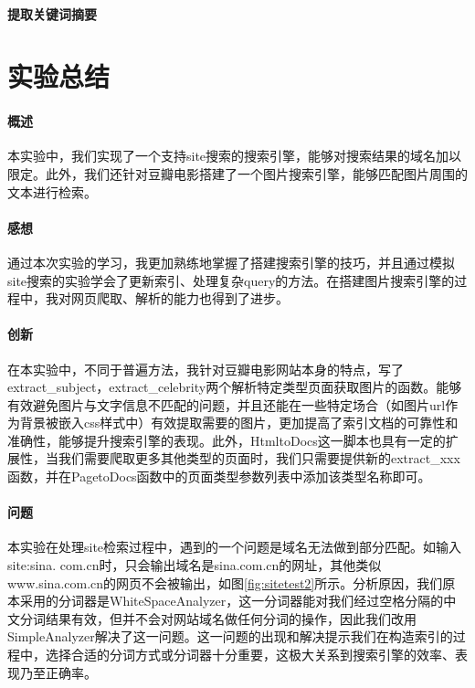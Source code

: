 \documentclass{article}
\begin{document}
\paragraph{提取关键词摘要}



\section{实验总结}
\paragraph{概述}
本实验中，我们实现了一个支持site搜索的搜索引擎，能够对搜索结果的域名加以限定。此外，我们还针对豆瓣电影搭建了一个图片搜索引擎，能够匹配图片周围的文本进行检索。

\paragraph{感想}
通过本次实验的学习，我更加熟练地掌握了搭建搜索引擎的技巧，并且通过模拟site搜索的实验学会了更新索引、处理复杂query的方法。在搭建图片搜索引擎的过程中，我对网页爬取、解析的能力也得到了进步。

\paragraph{创新}
在本实验中，不同于普遍方法，我针对豆瓣电影网站本身的特点，写了extract\_subject，extract\_celebrity两个解析特定类型页面获取图片的函数。能够有效避免图片与文字信息不匹配的问题，并且还能在一些特定场合（如图片url作为背景被嵌入css样式中）有效提取需要的图片，更加提高了索引文档的可靠性和准确性，能够提升搜索引擎的表现。此外，HtmltoDocs这一脚本也具有一定的扩展性，当我们需要爬取更多其他类型的页面时，我们只需要提供新的extract\_xxx函数，并在PagetoDocs函数中的页面类型参数列表中添加该类型名称即可。

\paragraph{问题}
本实验在处理site检索过程中，遇到的一个问题是域名无法做到部分匹配。如输入site:sina. com.cn时，只会输出域名是sina.com.cn的网址，其他类似www.sina.com.cn的网页不会被输出，如图\ref{fig:sitetest2}所示。分析原因，我们原本采用的分词器是WhiteSpaceAnalyzer，这一分词器能对我们经过空格分隔的中文分词结果有效，但并不会对网站域名做任何分词的操作，因此我们改用SimpleAnalyzer解决了这一问题。这一问题的出现和解决提示我们在构造索引的过程中，选择合适的分词方式或分词器十分重要，这极大关系到搜索引擎的效率、表现乃至正确率。
\end{document}
